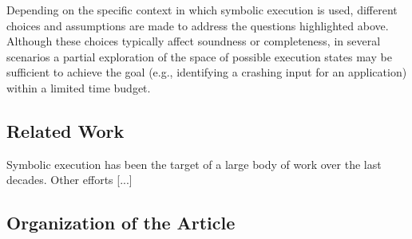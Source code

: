 \begin{itemize}[itemsep=2mm]
   
\end{itemize}

\noindent Depending on the specific context in which symbolic execution is used, different choices and assumptions are made to address the questions highlighted above. Although these choices typically affect soundness or completeness, in several scenarios a partial exploration of the space of possible execution states may be sufficient to achieve the goal (e.g., identifying a crashing input for an application) within a limited time budget.



\subsection{Related Work}
\label{ss:related-surveys}

Symbolic execution has been the target of a large body of work over the last decades. Other efforts [...]


\subsection{Organization of the Article}
\label{ss:article-organization}

